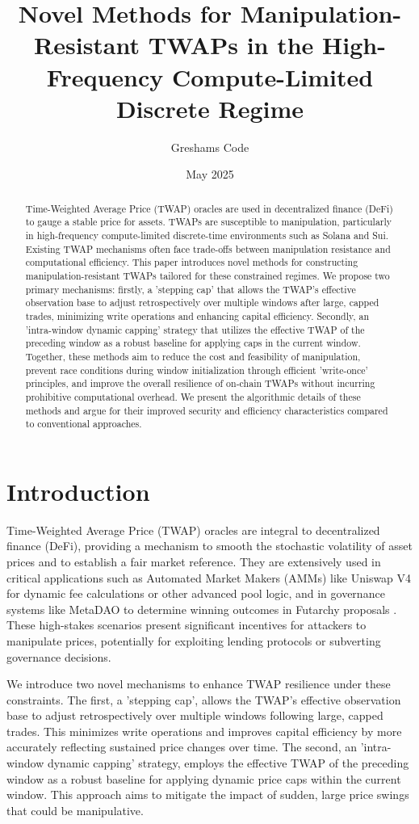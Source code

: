 \documentclass{article}
\title{Novel Methods for Manipulation-Resistant TWAPs in the High-Frequency Compute-Limited Discrete Regime}
\author[1]{Greshams Code}
\affil[1]{Founder, \href{https://govex.ai}{Govex.ai}}
\date{May 2025}
\begin{document}
\maketitle

\begin{abstract} 
Time-Weighted Average Price (TWAP) oracles are used in decentralized finance (DeFi) to gauge a stable price for assets. TWAPs are susceptible to manipulation, particularly in high-frequency compute-limited discrete-time environments such as Solana and Sui. Existing TWAP mechanisms often face trade-offs between manipulation resistance and computational efficiency. This paper introduces novel methods for constructing manipulation-resistant TWAPs tailored for these constrained regimes. We propose two primary mechanisms: firstly, a 'stepping cap' that allows the TWAP's effective observation base to adjust retrospectively over multiple windows after large, capped trades, minimizing write operations and enhancing capital efficiency. Secondly, an 'intra-window dynamic capping' strategy that utilizes the effective TWAP of the preceding window as a robust baseline for applying caps in the current window. Together, these methods aim to reduce the cost and feasibility of manipulation, prevent race conditions during window initialization through efficient 'write-once' principles, and improve the overall resilience of on-chain TWAPs without incurring prohibitive computational overhead. We present the algorithmic details of these methods and argue for their improved security and efficiency characteristics compared to conventional approaches.
\end{abstract}

\section{Introduction}
Time-Weighted Average Price (TWAP) oracles are integral to decentralized finance (DeFi), providing a mechanism to smooth the stochastic volatility of asset prices and to establish a fair market reference. They are extensively used in critical applications such as Automated Market Makers (AMMs) like Uniswap V4 for dynamic fee calculations or other advanced pool logic, and in governance systems like MetaDAO to determine winning outcomes in Futarchy proposals \cite{ammrs}. These high-stakes scenarios present significant incentives for attackers to manipulate prices, potentially for exploiting lending protocols or subverting governance decisions.

We introduce two novel mechanisms to enhance TWAP resilience under these constraints. The first, a 'stepping cap', allows the TWAP's effective observation base to adjust retrospectively over multiple windows following large, capped trades. This minimizes write operations and improves capital efficiency by more accurately reflecting sustained price changes over time. The second, an 'intra-window dynamic capping' strategy, employs the effective TWAP of the preceding window as a robust baseline for applying dynamic price caps within the current window. This approach aims to mitigate the impact of sudden, large price swings that could be manipulative.
\end{document}
